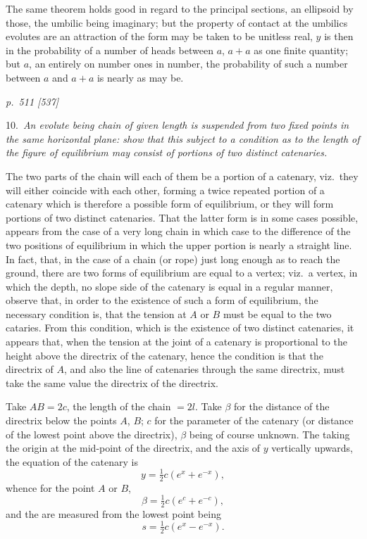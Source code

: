 \documentclass[11pt,a4paper]{book}
\begin{document}
The same theorem holds good in regard to the principal sections, an ellipsoid by
those, the umbilic being imaginary; but the property of contact at the umbilics evolutes
are an attraction of the form may be taken to be unitless real, $y$ is then in
the probability of a number of heads between $a$, $a + a$ as one finite quantity; but
$a$, an entirely on number ones in number, the probability of such a number between $a$
and $a + a$ is nearly as may be.

\clearpage

\bigskip
\textit{p.~511 [537]}
\smallskip

\noindent
\textsc{10.}\, \textit{An evolute being chain of given length is suspended from two fixed points in the
same horizontal plane: show that this subject to a condition as to the length of the figure
of equilibrium may consist of portions of two distinct catenaries.}

The two parts of the chain will each of them be a portion of a catenary, viz.\
they will either coincide with each other, forming a twice repeated portion of a
catenary which is therefore a possible form of equilibrium, or they will form portions
of two distinct catenaries. That the latter form is in some cases possible, appears
from the case of a very long chain in which case to the difference of the two positions of
equilibrium in which the upper portion is nearly a straight line. In fact, that, in
the case of a chain (or rope) just long enough as to reach the ground, there are two
forms of equilibrium are equal to a vertex; viz.\ a vertex, in which the depth, no
slope side of the catenary is equal in a regular manner, observe that, in order
to the existence of such a form of equilibrium, the necessary condition is, that the
tension at $A$ or $B$ must be equal to the two cataries. From this condition, which
is the existence of two distinct catenaries, it appears that, when the tension at the
joint of a catenary is proportional to the height above the directrix of the catenary,
hence the condition is that the directrix of $A$, and also the line of catenaries through
the same directrix, must take the same value the directrix of the directrix.

Take $AB = 2c$, the length of the chain $= 2l$. Take $\beta$ for the distance of the
directrix below the points $A$, $B$; $c$ for the parameter of the catenary (or distance of
the lowest point above the directrix), $\beta$ being of course unknown. The taking the
origin at the mid-point of the directrix, and the axis of $y$ vertically upwards, the
equation of the catenary is
\[
y = \tfrac{1}{2}c(e^x + e^{-x}),
\]
whence for the point $A$ or $B$,
\[
\beta = \tfrac{1}{2}c(e^{c} + e^{-c}),
\]
and the are measured from the lowest point being
\[
s = \tfrac{1}{2}c(e^x - e^{-x}).
\]
\end{document}
